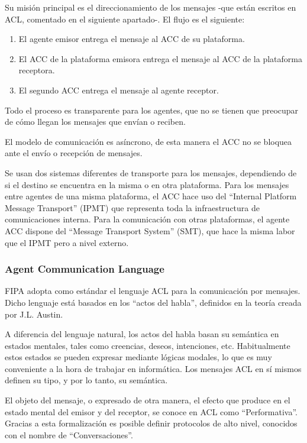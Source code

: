 Su misión principal es el direccionamiento de los mensajes -que están escritos
en ACL, comentado en el siguiente apartado-. El flujo es el siguiente:

\begin{enumerate}
 \item El agente emisor entrega el mensaje al ACC de su plataforma.
 \item El ACC de la plataforma emisora entrega el mensaje al ACC de la
 plataforma receptora.
 \item El segundo ACC entrega el mensaje al agente receptor.
\end{enumerate}

Todo el proceso es transparente para los agentes, que no se tienen que
preocupar de cómo llegan los mensajes que envían o reciben.

El modelo de comunicación es asíncrono, de esta manera el ACC no se bloquea
ante el envío o recepción de mensajes.

Se usan dos sistemas diferentes de transporte para los mensajes, dependiendo de
si el destino se encuentra en la misma o en otra plataforma. Para los mensajes
entre agentes de una misma plataforma, el ACC hace uso del ``Internal Platform
Message Transport'' (IPMT) que representa toda la infraestructura de
comunicaciones interna. Para la comunicación con otras plataformas, el agente
ACC dispone del ``Message Transport System'' (SMT), que hace la misma labor que
el IPMT pero a nivel externo.

\subsubsection*{Agent Communication Language}

FIPA adopta como estándar el lenguaje ACL para la comunicación por mensajes.
Dicho lenguaje está basados en los ``actos del habla'', definidos en la teoría
creada por J.L. Austin\cite{Austin62}.

A diferencia del lenguaje natural, los actos del habla basan su semántica en
estados mentales, tales como creencias, deseos, intenciones, etc. Habitualmente
estos estados se pueden expresar mediante lógicas modales, lo que es muy
conveniente a la hora de trabajar en informática. Los mensajes ACL en sí mismos
definen su tipo, y por lo tanto, su semántica.

El objeto del mensaje, o expresado de otra manera, el efecto que produce en el
estado mental del emisor y del receptor, se conoce en ACL como
``Performativa''. Gracias a esta formalización es posible definir protocolos de
alto nivel, conocidos con el nombre de ``Conversaciones''.

